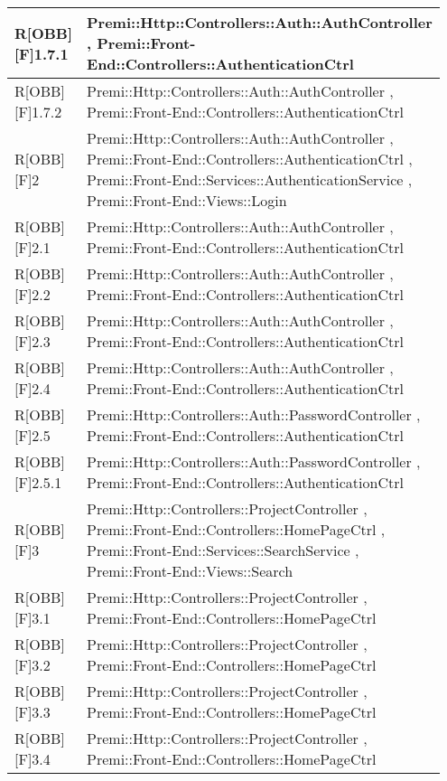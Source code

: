\begin{table}[h]
	\begin{center}
		\begin{tabular}{|p{0.2\linewidth}|p{0.75\linewidth}|}
			\toprule
			R[OBB][F]1.7.1 & Premi::Http::Controllers::Auth::AuthController , Premi::Front-End::Controllers::AuthenticationCtrl\\
		\midrule
			R[OBB][F]1.7.2 & Premi::Http::Controllers::Auth::AuthController , Premi::Front-End::Controllers::AuthenticationCtrl\\
		\midrule
			R[OBB][F]2 & Premi::Http::Controllers::Auth::AuthController , Premi::Front-End::Controllers::AuthenticationCtrl , Premi::Front-End::Services::AuthenticationService , Premi::Front-End::Views::Login\\
		\midrule
			R[OBB][F]2.1 & Premi::Http::Controllers::Auth::AuthController , Premi::Front-End::Controllers::AuthenticationCtrl\\
		\midrule
			R[OBB][F]2.2 & Premi::Http::Controllers::Auth::AuthController , Premi::Front-End::Controllers::AuthenticationCtrl\\
		\midrule
			R[OBB][F]2.3 & Premi::Http::Controllers::Auth::AuthController , Premi::Front-End::Controllers::AuthenticationCtrl\\
		\midrule
			R[OBB][F]2.4 & Premi::Http::Controllers::Auth::AuthController , Premi::Front-End::Controllers::AuthenticationCtrl\\
		\midrule
			R[OBB][F]2.5 & Premi::Http::Controllers::Auth::PasswordController , Premi::Front-End::Controllers::AuthenticationCtrl\\
		\midrule
			R[OBB][F]2.5.1 & Premi::Http::Controllers::Auth::PasswordController , Premi::Front-End::Controllers::AuthenticationCtrl\\
		\midrule
			R[OBB][F]3 & Premi::Http::Controllers::ProjectController , Premi::Front-End::Controllers::HomePageCtrl , Premi::Front-End::Services::SearchService , Premi::Front-End::Views::Search\\
		\midrule
			R[OBB][F]3.1 & Premi::Http::Controllers::ProjectController , Premi::Front-End::Controllers::HomePageCtrl\\
		\midrule
			R[OBB][F]3.2 & Premi::Http::Controllers::ProjectController , Premi::Front-End::Controllers::HomePageCtrl\\
		\midrule
			R[OBB][F]3.3 & Premi::Http::Controllers::ProjectController , Premi::Front-End::Controllers::HomePageCtrl\\
		\midrule
			R[OBB][F]3.4 & Premi::Http::Controllers::ProjectController , Premi::Front-End::Controllers::HomePageCtrl\\

\end{tabular}
\end{center}
\end{table}
